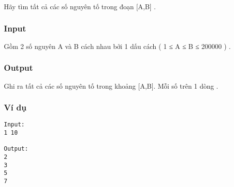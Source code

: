 



   Hãy tìm tất cả các số nguyên tố trong đoạn [A,B] .  

\subsubsection{   Input  }

   Gồm 2 số nguyên A và B cách nhau bởi 1 dấu cách ( 1 ≤ A ≤ B ≤ 200000 ) .  

\subsubsection{   Output  }

   Ghi ra tất cả các số nguyên tố trong khoảng [A,B]. Mỗi số trên 1 dòng .  

\subsubsection{   Ví dụ  }
\begin{verbatim}
Input:
1 10

Output:
2
3
5
7
\end{verbatim}